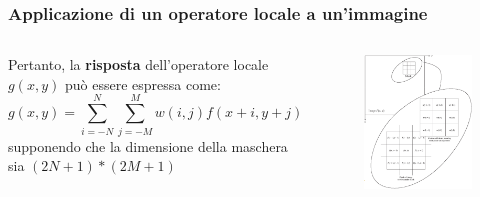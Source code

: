 \begin{frame}

	\frametitle{Applicazione di un operatore locale a un'immagine}

		\begin{columns}
		  	Pertanto, la \textbf{risposta} dell'operatore locale $g(x, y)$
		  	può essere espressa come:
		  	$$g(x, y) = \sum_{i=-N}^{N} \sum_{j=-M}^{M} w(i, j) f(x+i, y+j)$$
		  	supponendo che la dimensione della maschera sia $(2N+1)*(2M+1)$

			\begin{figure}[!htbp]
				\centering
				\includegraphics[width=0.95\linewidth]{images/supervised/z_algorithms_deep_learning/convolution_and_correlation_1.png}
			\end{figure}

		\end{columns}

\end{frame}


